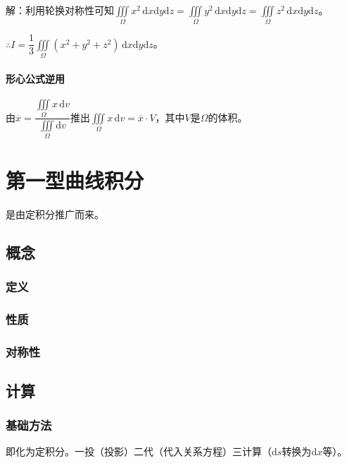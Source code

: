 \documentclass[UTF8, 12pt]{ctexart}
\begin{document}
解：利用轮换对称性可知$\iiint\limits_\Omega x^2\,\textrm{d}x\textrm{d}y\textrm{d}z=\iiint\limits_\Omega y^2\,\textrm{d}x\textrm{d}y\textrm{d}z=\iiint\limits_\Omega z^2\,\textrm{d}x\textrm{d}y\textrm{d}z$。

$\therefore I=\dfrac{1}{3}\iiint\limits_\Omega(x^2+y^2+z^2)\,\textrm{d}x\textrm{d}y\textrm{d}z$。

\paragraph{形心公式逆用} \leavevmode \medskip

由$\overline{x}=\dfrac{\iiint\limits_\Omega x\,\textrm{d}v}{\iiint\limits_\Omega\textrm{d}v}$推出$\iiint\limits_\Omega x\,\textrm{d}v=\overline{x}\cdot V$，其中$V$是$\Omega$的体积。

\section{第一型曲线积分}

是由定积分推广而来。

\subsection{概念}

\subsubsection{定义}

\subsubsection{性质}

\subsubsection{对称性}

\subsection{计算}

\subsubsection{基础方法}

即化为定积分。一投（投影）二代（代入关系方程）三计算（$\textrm{d}s$转换为$\textrm{d}x$等）。
\end{document}
